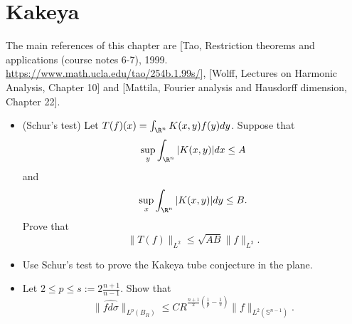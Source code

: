\section{Kakeya}
The main references of this chapter are [Tao, Restriction theorems and applications 
(course notes 6-7), 1999. \url{https://www.math.ucla.edu/tao/254b.1.99s/}],
[Wolff, Lectures on Harmonic Analysis, Chapter 10] and 
[Mattila, Fourier analysis and Hausdorff dimension, Chapter 22].
\begin{itemize}
    \item[1.](Schur's test) Let $T(f)(x)=\int_{\R^n}K(x,y)f(y)dy$. Suppose that
    $$\sup_y\int_{\R^n}|K(x,y)|dx\le A$$ and
    $$\sup_x\int_{\R^n}|K(x,y)|dy\le B.$$
    Prove that $$\|T(f)\|_{L^2}\le\sqrt{AB}\|f\|_{L^2}.$$

    \item[2.] Use Schur's test to prove the Kakeya tube conjecture in the plane.

    \item[3.] Let $2\le p\le s:=2\frac{n+1}{n-1}$. Show that
    $$\|\widehat{fd\sigma}\|_{L^p(B_R)}
    \le CR^{\frac{n+1}{2}(\frac{1}{p}-\frac{1}{s})}\|f\|_{L^2(\mathbb{S}^{n-1})}.$$
    
\end{itemize}